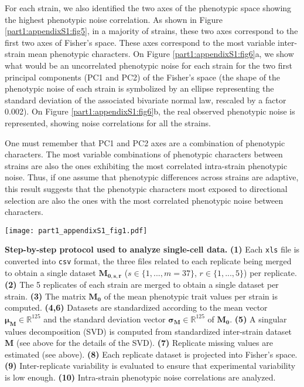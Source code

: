 For each strain, we also identified the two axes of the phenotypic space showing the highest phenotypic noise correlation. As shown in Figure \ref{part1:appendixS1:fig5}, in a majority of strains, these two axes correspond to the first two axes of Fisher's space. These axes correspond to the most variable inter-strain mean phenotypic characters.
On Figure \ref{part1:appendixS1:fig6}a, we show what would be an uncorrelated phenotypic noise for each strain for the two first principal components (PC1 and PC2) of the Fisher's space (the shape of the phenotypic noise of each strain is symbolized by an ellipse representing the standard deviation of the associated bivariate normal law, rescaled by a factor 0.002). On Figure \ref{part1:appendixS1:fig6}b, the real observed phenotypic noise is represented, showing noise correlations for all the strains.

One must remember that PC1 and PC2 axes are a combination of phenotypic characters. The most variable combinations of phenotypic characters between strains are also the ones exhibiting the most correlated intra-strain phenotypic noise. Thus, if one assume that phenotypic differences across strains are adaptive, this result suggests that the phenotypic characters most exposed to directional selection are also the ones with the most correlated phenotypic noise between characters.


\newpage

\begin{figurehere}
\begin{adjustwidth}{-0in}{0in}
\centering
\texttt{[image: part1\_appendixS1\_fig1.pdf]}
\end{adjustwidth}
\caption[Step-by-step protocol used to analyze single-cell data.]{
\textbf{Step-by-step protocol used to analyze single-cell data.}
\textbf{(1)} Each \texttt{xls} file is converted into \texttt{csv} format, the three files related to each replicate being merged to obtain a single dataset $\boldsymbol{M_{0,s,r}}$ ($s \in \{1,...,m=37\}$, $r \in \{1,...,5\}$) per replicate.
\textbf{(2)} The 5 replicates of each strain are merged to obtain a single dataset per strain.
\textbf{(3)} The matrix $\boldsymbol{M_0}$ of the mean phenotypic trait values per strain is computed.
\textbf{(4,6)} Datasets are standardized according to the mean vector $\boldsymbol{\mu_M} \in \mathbb{R}^{125}$ and the standard deviation vector $\boldsymbol{\sigma_M} \in \mathbb{R}^{125}$ of $\boldsymbol{M_0}$.
\textbf{(5)} A singular values decomposition (SVD) is computed from standardized inter-strain dataset $\boldsymbol{M}$ (see above for the details of the SVD).
\textbf{(7)} Replicate missing values are estimated (see above).
\textbf{(8)} Each replicate dataset is projected into Fisher's space.
\textbf{(9)} Inter-replicate variability is evaluated to ensure that experimental variability is low enough.
\textbf{(10)} Intra-strain phenotypic noise correlations are analyzed.
}
\label{part1:appendixS1:fig1}
\end{figurehere}

